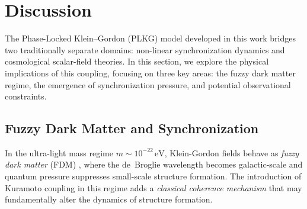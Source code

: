 
\section{Discussion}
\label{sec:discussion}

The Phase-Locked Klein--Gordon (PLKG) model developed in this work bridges two traditionally separate domains: non-linear synchronization dynamics and cosmological scalar-field theories. In this section, we explore the physical implications of this coupling, focusing on three key areas: the fuzzy dark matter regime, the emergence of synchronization pressure, and potential observational constraints.

\subsection{Fuzzy Dark Matter and Synchronization}
\label{subsec:fdm_sync}

In the ultra-light mass regime $m \sim 10^{-22}\,\text{eV}$, Klein-Gordon fields behave as \emph{fuzzy dark matter} (FDM) \cite{Hu2000,Marsh2016}, where the de~Broglie wavelength becomes galactic-scale and quantum pressure suppresses small-scale structure formation. The introduction of Kuramoto coupling in this regime adds a \emph{classical coherence mechanism} that may fundamentally alter the dynamics of structure formation.

